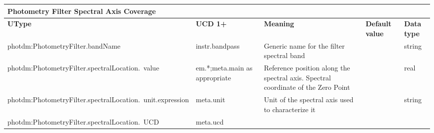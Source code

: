 \documentclass[11pt,a4paper]{ivoa}
\begin{document}
\begin{appendices}
\begin{table}[H]
\centering
\begin{adjustbox}{angle=90}
\begin{tabular}{p{2.5in}|p{1.5in}|p{2in}|p{0.74in}|p{0.35in}}
\multicolumn{5}{p{\dimexpr6.59in+8\tabcolsep\relax}}{\centering
{\fontsize{8pt}{8pt}\selectfont \textbf{Photometry Filter Spectral Axis Coverage}}} \\
\hline
\multicolumn{1}{p{2.5in}}{{\fontsize{8pt}{8pt}\selectfont \textbf{UType}}} &
\multicolumn{1}{p{1.5in}}{{\fontsize{8pt}{8pt}\selectfont \textbf{UCD 1+}}} &
\multicolumn{1}{p{2in}}{{\fontsize{8pt}{8pt}\selectfont \textbf{Meaning}}} &
\multicolumn{1}{p{0.74in}}{{\fontsize{8pt}{8pt}\selectfont \textbf{Default value}}} &
\multicolumn{1}{p{0.35in}}{{\fontsize{8pt}{8pt}\selectfont \textbf{Data type}}} \\
\hline
\multicolumn{1}{p{2.5in}}{{\fontsize{8pt}{8pt}\selectfont photdm:PhotometryFilter.bandName}} &
\multicolumn{1}{p{1.5in}}{{\fontsize{8pt}{8pt}\selectfont instr.bandpass }} &
\multicolumn{1}{p{2in}}{{\fontsize{8pt}{8pt}\selectfont Generic name for the
filter spectral band}} &
\multicolumn{1}{p{0.74in}}{} &
\multicolumn{1}{p{0.35in}}{{\fontsize{8pt}{8pt}\selectfont string}} \\
\hline
\multicolumn{1}{p{2.5in}}{{\fontsize{8pt}{8pt}
\selectfont photdm:PhotometryFilter.spectralLocation.\ value}} &
\multicolumn{1}{p{1.5in}}{{\fontsize{8pt}{8pt}\selectfont em.*;meta.main as appropriate}} &
\multicolumn{1}{p{2in}}{{\fontsize{8pt}{8pt}\selectfont Reference position along the
spectral axis. Spectral coordinate of the Zero Point }} &
\multicolumn{1}{p{0.74in}}{} &
\multicolumn{1}{p{0.35in}}{{\fontsize{8pt}{8pt}\selectfont real}} \\
\hline
\multicolumn{1}{p{2.5in}}{{\fontsize{8pt}{8pt}
\selectfont photdm:PhotometryFilter.spectralLocation.\ unit.expression}} &
\multicolumn{1}{p{1.5in}}{{\fontsize{8pt}{8pt}\selectfont meta.unit }} &
\multicolumn{1}{p{2in}}{{\fontsize{8pt}{8pt}\selectfont Unit of the spectral axis used
to characterize it}} &
\multicolumn{1}{p{0.74in}}{{\fontsize{8pt}{8pt}\selectfont }} &
\multicolumn{1}{p{0.35in}}{{\fontsize{8pt}{8pt}\selectfont string}} \\
\hline
\multicolumn{1}{p{2.5in}}{{\fontsize{8pt}{8pt}
\selectfont photdm:PhotometryFilter.spectralLocation.\ UCD}} &
\multicolumn{1}{p{1.5in}}{{\fontsize{8pt}{8pt}\selectfont meta.ucd }} &

\end{tabular}
\end{adjustbox}
\end{table}
\end{appendices}
\end{document}
